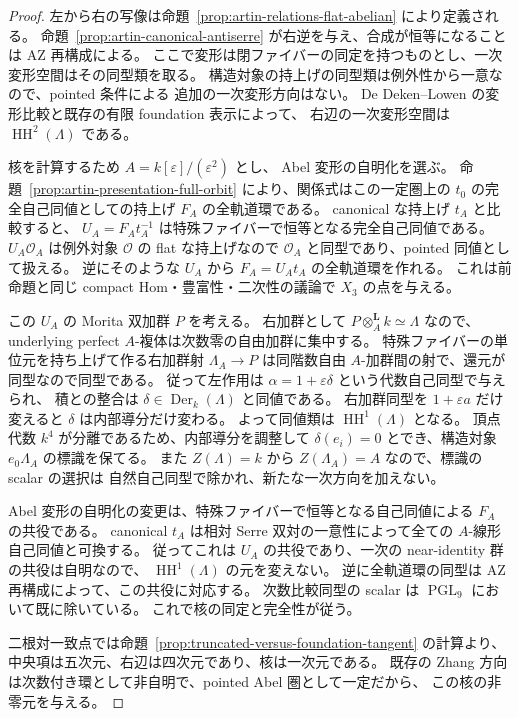 \begin{proof}
左から右の写像は命題~\ref{prop:artin-relations-flat-abelian} により定義される。
命題~\ref{prop:artin-canonical-antiserre} が右逆を与え、合成が恒等になることは
AZ 再構成による。
ここで変形は閉ファイバーの同定を持つものとし、一次変形空間はその同型類を取る。
構造対象の持上げの同型類は例外性から一意なので、pointed 条件による
追加の一次変形方向はない。
De Deken--Lowen の変形比較と既存の有限 foundation 表示によって、
右辺の一次変形空間は $\operatorname{HH}^{2}(\Lambda)$ である。

核を計算するため $A=k[\varepsilon]/(\varepsilon^2)$ とし、
Abel 変形の自明化を選ぶ。
命題~\ref{prop:artin-presentation-full-orbit} により、関係式はこの一定圏上の
$t_0$ の完全自己同値としての持上げ $F_A$ の全軌道環である。
canonical な持上げ $t_A$ と比較すると、
$U_A=F_A t_A^{-1}$ は特殊ファイバーで恒等となる完全自己同値である。
$U_A\mathcal O_A$ は例外対象 $\mathcal O$ の flat な持上げなので
$\mathcal O_A$ と同型であり、pointed 同値として扱える。
逆にそのような $U_A$ から $F_A=U_A t_A$ の全軌道環を作れる。
これは前命題と同じ compact Hom・豊富性・二次性の議論で $X_3$ の点を与える。

この $U_A$ の Morita 双加群 $P$ を考える。
右加群として $P\otimes_A^{\mathbf L}k\simeq\Lambda$ なので、
underlying perfect $A$-複体は次数零の自由加群に集中する。
特殊ファイバーの単位元を持ち上げて作る右加群射
$\Lambda_A\to P$ は同階数自由 $A$-加群間の射で、還元が同型なので同型である。
従って左作用は $\alpha=1+\varepsilon\delta$ という代数自己同型で与えられ、
積との整合は $\delta\in\operatorname{Der}_k(\Lambda)$ と同値である。
右加群同型を $1+\varepsilon a$ だけ変えると $\delta$ は内部導分だけ変わる。
よって同値類は $\operatorname{HH}^{1}(\Lambda)$ となる。
頂点代数 $k^4$ が分離であるため、内部導分を調整して
$\delta(e_i)=0$ とでき、構造対象 $e_0\Lambda_A$ の標識を保てる。
また $Z(\Lambda)=k$ から $Z(\Lambda_A)=A$ なので、標識の scalar の選択は
自然自己同型で除かれ、新たな一次方向を加えない。

Abel 変形の自明化の変更は、特殊ファイバーで恒等となる自己同値による
$F_A$ の共役である。
canonical $t_A$ は相対 Serre 双対の一意性によって全ての $A$-線形自己同値と可換する。
従ってこれは $U_A$ の共役であり、一次の near-identity 群の共役は自明なので、
$\operatorname{HH}^{1}(\Lambda)$ の元を変えない。
逆に全軌道環の同型は AZ 再構成によって、この共役に対応する。
次数比較同型の scalar は $\operatorname{PGL}_9$ において既に除いている。
これで核の同定と完全性が従う。

二根対一致点では命題~\ref{prop:truncated-versus-foundation-tangent} の計算より、
中央項は五次元、右辺は四次元であり、核は一次元である。
既存の Zhang 方向は次数付き環として非自明で、pointed Abel 圏として一定だから、
この核の非零元を与える。
\end{proof}


